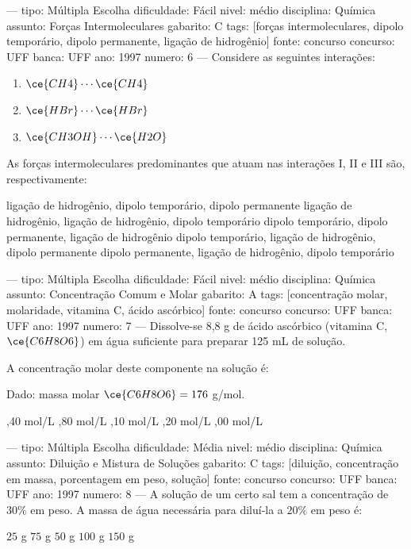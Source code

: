---
tipo: Múltipla Escolha
dificuldade: Fácil
nivel: médio
disciplina: Química
assunto: Forças Intermoleculares
gabarito: C
tags: [forças intermoleculares, dipolo temporário, dipolo permanente, ligação de hidrogênio]
fonte: concurso
concurso: UFF
banca: UFF
ano: 1997
numero: 6
---
\question
Considere as seguintes interações:
\begin{enumerate}
\item $\ce{CH4} \cdots \ce{CH4}$
\item $\ce{HBr} \cdots \ce{HBr}$
\item $\ce{CH3OH} \cdots \ce{H2O}$
\end{enumerate}
As forças intermoleculares predominantes que atuam nas interações I, II e III são, respectivamente:
\begin{choices}
\choice ligação de hidrogênio, dipolo temporário, dipolo permanente
\choice ligação de hidrogênio, ligação de hidrogênio, dipolo temporário
\CorrectChoice dipolo temporário, dipolo permanente, ligação de hidrogênio
\choice dipolo temporário, ligação de hidrogênio, dipolo permanente
\choice dipolo permanente, ligação de hidrogênio, dipolo temporário
\end{choices}

---
tipo: Múltipla Escolha
dificuldade: Fácil
nivel: médio
disciplina: Química
assunto: Concentração Comum e Molar
gabarito: A
tags: [concentração molar, molaridade, vitamina C, ácido ascórbico]
fonte: concurso
concurso: UFF
banca: UFF
ano: 1997
numero: 7
---
\question
Dissolve-se 8,8 g de ácido ascórbico (vitamina C, $\ce{C6H8O6}$) em água suficiente para preparar 125 mL de solução.

A concentração molar deste componente na solução é:

Dado: massa molar $\ce{C6H8O6} = 176$ g/mol.
\begin{choices}
,40 mol/L
,80 mol/L
,10 mol/L
,20 mol/L
,00 mol/L
\end{choices}

---
tipo: Múltipla Escolha
dificuldade: Média
nivel: médio
disciplina: Química
assunto: Diluição e Mistura de Soluções
gabarito: C
tags: [diluição, concentração em massa, porcentagem em peso, solução]
fonte: concurso
concurso: UFF
banca: UFF
ano: 1997
numero: 8
---
\question
A solução de um certo sal tem a concentração de $30\%$ em peso. A massa de água necessária para diluí-la a $20\%$ em peso é:
\begin{choices}
\choice $25$ g
\choice $75$ g
\CorrectChoice $50$ g
\choice $100$ g
\choice $150$ g
\end{choices}

